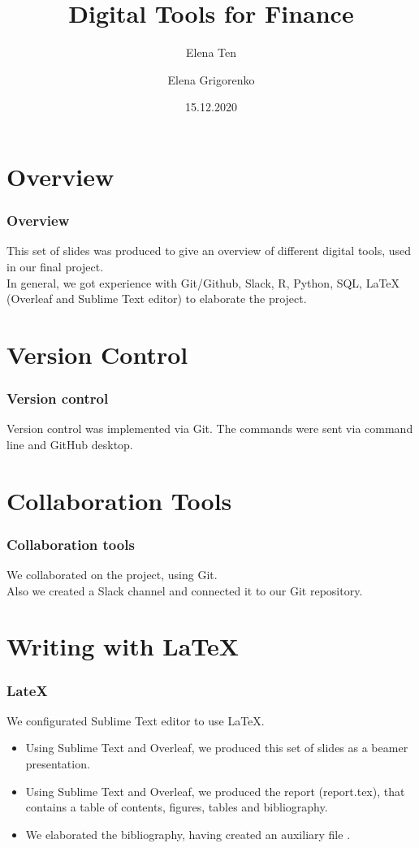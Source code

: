 \documentclass {beamer}
\title{Digital Tools for Finance}
\author [Ten, Grigorenko] {Elena Ten \and Elena Grigorenko}
\institute [UZH] {University of Zurich}
\date {15.12.2020}
\begin{document}
\frame{\titlepage}

\section{Overview}
\begin{frame}
\frametitle{Overview}
This set of slides was produced to give an overview of different digital tools, used in our final project.\\
In general, we got experience with Git/Github, Slack, R, Python, SQL, LaTeX (Overleaf and Sublime Text editor) to elaborate the project. 

\end{frame}



\section{Version Control}
\begin{frame}
\frametitle{Version control}
Version control was implemented via Git. The commands were sent via command line and GitHub desktop.

\end{frame}


\section{Collaboration Tools}
\begin{frame}
\frametitle{Collaboration tools}
We collaborated on the project, using Git.\\
Also we created a Slack channel and connected it to our Git repository.

\end{frame}


\section{Writing with LaTeX}
\begin{frame}
\frametitle{LateX}
We configurated Sublime Text editor to use LaTeX.\\
\begin{itemize}
\item Using Sublime Text and Overleaf, we produced this set of slides as a beamer presentation.
\item Using Sublime Text and Overleaf, we produced the report (report.tex), that contains a table of contents, figures, tables and bibliography.
\item We elaborated the bibliography, having created an auxiliary file .
\end{itemize}

\end{frame}
\end{document}
